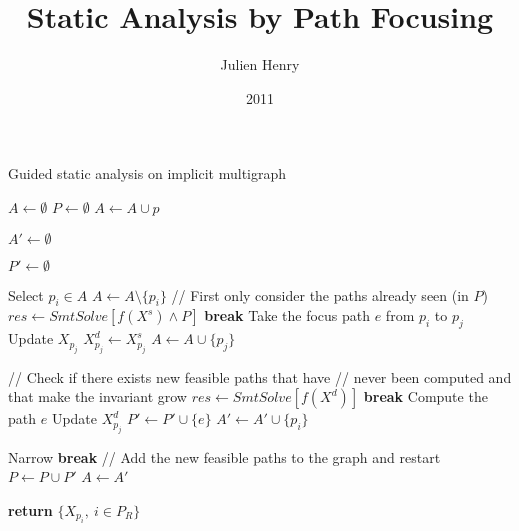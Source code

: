 \documentclass[a4paper,9pt]{article}
\title{Static Analysis by Path Focusing}
\author{Julien Henry}
\date{2011}
\begin{document}
 \begin{algorithm}
 \caption{Guided static analysis on implicit multigraph}
\begin{algorithmic}%
\STATE $A \gets \emptyset$
\STATE $P \gets \emptyset$
	\STATE $A \gets A \cup p$
\ENDFOR

\STATE $A' \gets \emptyset$

\STATE $P' \gets \emptyset$

	\STATE Select $p_i \in A$
	\STATE $A \gets A \setminus \{p_i\}$
	\STATE // First only consider the paths already seen (in $P$)
		\STATE $res \gets SmtSolve\left[
		f(X^s) \wedge P
		\right]$
			\STATE \textbf{break}
		\ENDIF
		\STATE Take the focus path $e$ from $p_i$ to $p_j$
		\STATE Update $X_{p_j}$
		\STATE $X^d_{p_j} \gets X^s_{p_j}$
		\STATE $A \gets A \cup \{p_j\}$
	\ENDWHILE

	\STATE // Check if there exists new feasible paths that have 
	\STATE // never been computed and that make the invariant grow
		\STATE $res \gets SmtSolve\left[
		 f(X^d) 
		\right]$
			\STATE \textbf{break}
		\ENDIF
		\STATE Compute the path $e$
		\STATE Update $X^d_{p_j}$
		\STATE $P' \gets P' \cup \{e\}$
		\STATE $A' \gets A' \cup \{p_i\}$
	\ENDWHILE

\ENDWHILE
\STATE Narrow
	\STATE \textbf{break}
\ENDIF
\STATE // Add the new feasible paths to the graph and restart 
\STATE $P \gets P \cup P'$
\STATE $A \gets A'$
\ENDWHILE

\STATE \textbf{return} $\{X_{p_i},\ i \in P_R\}$
\end{algorithmic}
\end{algorithm}

\bigskip
\end{document}
